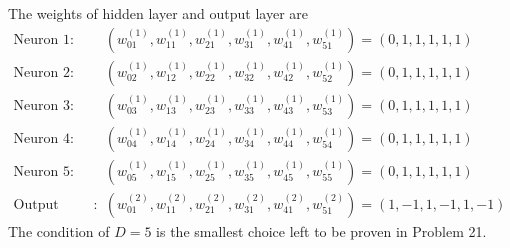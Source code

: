 \documentclass[12pt]{article}
\newcommand{\ParTh}[1]{\left(#1\right)}
\begin{document}
The weights of hidden layer and output layer are
\begin{align}
\text{Neuron 1}:&\ParTh{w^{\ParTh{1}}_{01},w^{\ParTh{1}}_{11},w^{\ParTh{1}}_{21},w^{\ParTh{1}}_{31},w^{\ParTh{1}}_{41},w^{\ParTh{1}}_{51}}=\ParTh{0,1,1,1,1,1}\\
\text{Neuron 2}:&\ParTh{w^{\ParTh{1}}_{02},w^{\ParTh{1}}_{12},w^{\ParTh{1}}_{22},w^{\ParTh{1}}_{32},w^{\ParTh{1}}_{42},w^{\ParTh{1}}_{52}}=\ParTh{0,1,1,1,1,1}\\
\text{Neuron 3}:&\ParTh{w^{\ParTh{1}}_{03},w^{\ParTh{1}}_{13},w^{\ParTh{1}}_{23},w^{\ParTh{1}}_{33},w^{\ParTh{1}}_{43},w^{\ParTh{1}}_{53}}=\ParTh{0,1,1,1,1,1}\\
\text{Neuron 4}:&\ParTh{w^{\ParTh{1}}_{04},w^{\ParTh{1}}_{14},w^{\ParTh{1}}_{24},w^{\ParTh{1}}_{34},w^{\ParTh{1}}_{44},w^{\ParTh{1}}_{54}}=\ParTh{0,1,1,1,1,1}\\
\text{Neuron 5}:&\ParTh{w^{\ParTh{1}}_{05},w^{\ParTh{1}}_{15},w^{\ParTh{1}}_{25},w^{\ParTh{1}}_{35},w^{\ParTh{1}}_{45},w^{\ParTh{1}}_{55}}=\ParTh{0,1,1,1,1,1}\\
\text{Output Neuron}:&\ParTh{w^{\ParTh{2}}_{01},w^{\ParTh{2}}_{11},w^{\ParTh{2}}_{21},w^{\ParTh{2}}_{31},w^{\ParTh{2}}_{41},w^{\ParTh{2}}_{51}}=\ParTh{1,-1,1,-1,1,-1}
\end{align}
The condition of $D=5$ is the smallest choice left to be proven in Problem 21.

\end{document}
